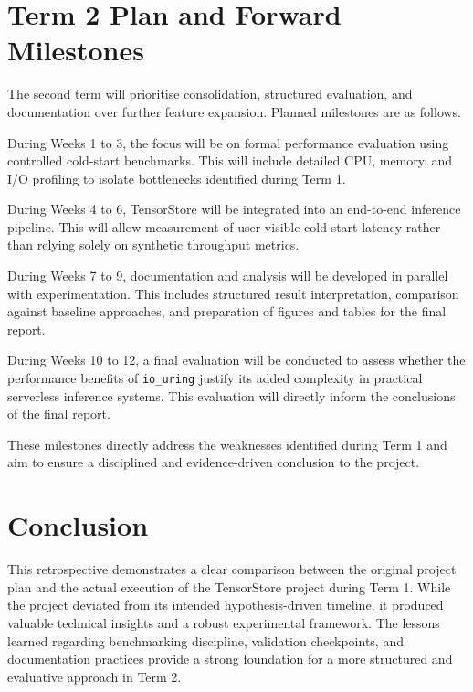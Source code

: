 \documentclass{article}
\begin{document}
\section{Term 2 Plan and Forward Milestones}

The second term will prioritise consolidation, structured evaluation, and documentation over further feature expansion. Planned milestones are as follows.

During Weeks 1 to 3, the focus will be on formal performance evaluation using controlled cold-start benchmarks. This will include detailed CPU, memory, and I/O profiling to isolate bottlenecks identified during Term 1.

During Weeks 4 to 6, TensorStore will be integrated into an end-to-end inference pipeline. This will allow measurement of user-visible cold-start latency rather than relying solely on synthetic throughput metrics.

During Weeks 7 to 9, documentation and analysis will be developed in parallel with experimentation. This includes structured result interpretation, comparison against baseline approaches, and preparation of figures and tables for the final report.

During Weeks 10 to 12, a final evaluation will be conducted to assess whether the performance benefits of \texttt{io\_uring} justify its added complexity in practical serverless inference systems. This evaluation will directly inform the conclusions of the final report.

These milestones directly address the weaknesses identified during Term 1 and aim to ensure a disciplined and evidence-driven conclusion to the project.

\section{Conclusion}

This retrospective demonstrates a clear comparison between the original project plan and the actual execution of the TensorStore project during Term 1. While the project deviated from its intended hypothesis-driven timeline, it produced valuable technical insights and a robust experimental framework. The lessons learned regarding benchmarking discipline, validation checkpoints, and documentation practices provide a strong foundation for a more structured and evaluative approach in Term 2.
\end{document}
